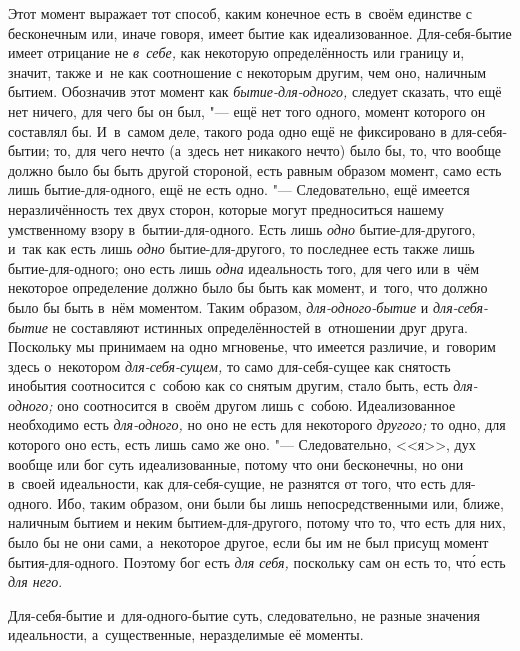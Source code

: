 
Этот момент выражает тот способ, каким конечное есть в~своём единстве с
бесконечным или, иначе говоря, имеет бытие как идеализованное.
Для-себя-бытие имеет отрицание не {\em в~себе,} как
некоторую определённость или границу и, значит, также и~не как соотношение
с некоторым другим, чем оно, наличным бытием. Обозначив этот момент как
{\em бытие-для-одного,} следует сказать, что ещё нет
ничего, для чего бы он был, "--- ещё нет того одного, момент которого он
составлял бы. И~в~самом деле, такого рода одно ещё не фиксировано в
для-себя-бытии; то, для чего нечто (а~здесь нет никакого нечто) было бы,
то, что вообще должно было бы быть другой стороной, есть равным образом
момент, само есть лишь бытие-для-одного, ещё не есть одно. "--- Следовательно,
ещё имеется неразличённость тех двух сторон, которые могут предноситься
нашему умственному взору в~бытии-для-одного. Есть лишь
{\em одно} бытие-для-другого, и~так как есть лишь
{\em одно} бытие-для-другого, то последнее есть также
лишь бытие-для-одного; оно есть лишь {\em одна}
идеальность того, для чего или в~чём некоторое определение должно было бы
быть как момент, и~того, что должно было бы быть в~нём моментом. Таким
образом, {\em для-одного-бытие} и
{\em для-себя-бытие} не составляют истинных
определённостей в~отношении друг друга. Поскольку мы принимаем на одно
мгновенье, что имеется различие, и~говорим здесь о~некотором
{\em для-себя-сущем,} то само для-себя-сущее как
снятость инобытия соотносится с~собою как со снятым другим, стало быть,
есть {\em для-одного;} оно соотносится в~своём другом
лишь с~собою. Идеализованное необходимо есть
{\em для-одного,} но оно не есть для некоторого
{\em другого;} то одно, для которого оно есть, есть
лишь само же оно. "--- Следовательно, <<я>>, дух вообще или бог суть
идеализованные, потому что они бесконечны, но они в~своей идеальности, как
для-себя-сущие, не разнятся от того, что есть для-одного. Ибо, таким
образом, они были бы лишь непосредственными или, ближе, наличным бытием и
неким бытием-для-другого, потому что то, что есть для них, было бы не они
сами, а~некоторое другое, если бы им не был присущ момент бытия-для-одного.
Поэтому бог есть {\em для себя,} поскольку сам он есть
то, чт\'{о} есть {\em для него}.

Для-себя-бытие и~для-одного-бытие суть, следовательно, не разные значения
идеальности, а~существенные, неразделимые её моменты.


